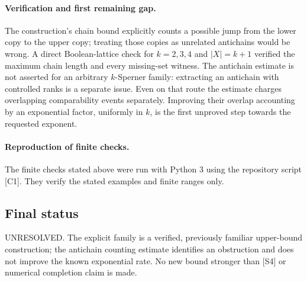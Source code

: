\documentclass[11pt,a4paper]{article}
\begin{document}
\paragraph{Verification and first remaining gap.}
The construction's chain bound explicitly counts a possible jump from
the lower copy to the upper copy; treating those copies as unrelated
antichains would be wrong. A direct Boolean-lattice check for
$k=2,3,4$ and $|X|=k+1$ verified the maximum chain length and
every missing-set witness. The antichain estimate is not asserted for
an arbitrary $k$-Sperner family: extracting an antichain with controlled
ranks is a separate issue. Even on that route the estimate charges
overlapping comparability events separately. Improving their overlap
accounting by an exponential factor, uniformly in $k$, is the first
unproved step towards the requested exponent.

\paragraph{Reproduction of finite checks.}
The finite checks stated above were run with Python 3 using the repository
script [C1]. They verify the stated examples and finite ranges only.

\subsection{Final status}
UNRESOLVED. The explicit family is a verified, previously familiar
upper-bound construction; the antichain counting estimate identifies
an obstruction and does not improve the known exponential rate.
No new bound stronger than [S4] or numerical completion claim is made.
\end{document}
